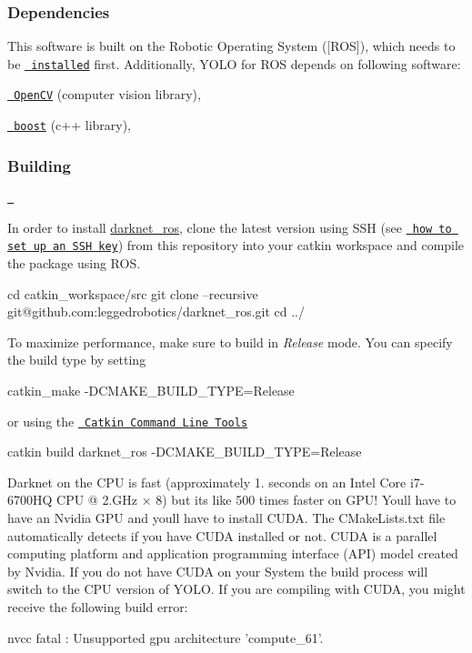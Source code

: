 \subsubsection*{Dependencies}

This software is built on the Robotic Operating System (\mbox{[}R\+OS\mbox{]}), which needs to be \href{http://wiki.ros.org}{\texttt{ installed}} first. Additionally, Y\+O\+LO for R\+OS depends on following software\+:


\begin{DoxyItemize}
\item \href{http://opencv.org/}{\texttt{ Open\+CV}} (computer vision library),
\item \href{http://www.boost.org/}{\texttt{ boost}} (c++ library),
\end{DoxyItemize}

\subsubsection*{Building}

\href{https://ci.leggedrobotics.com/job/github_leggedrobotics/job/darknet_ros/job/master/}{\texttt{ }}

In order to install \mbox{\hyperlink{namespacedarknet__ros}{darknet\+\_\+ros}}, clone the latest version using S\+SH (see \href{https://confluence.atlassian.com/bitbucket/set-up-an-ssh-key-728138079.html}{\texttt{ how to set up an S\+SH key}}) from this repository into your catkin workspace and compile the package using R\+OS. \begin{DoxyVerb}cd catkin_workspace/src
git clone --recursive git@github.com:leggedrobotics/darknet_ros.git
cd ../
\end{DoxyVerb}


To maximize performance, make sure to build in {\itshape Release} mode. You can specify the build type by setting \begin{DoxyVerb}catkin_make -DCMAKE_BUILD_TYPE=Release
\end{DoxyVerb}


or using the \href{http://catkin-tools.readthedocs.io/en/latest/index.html\#}{\texttt{ Catkin Command Line Tools}} \begin{DoxyVerb}catkin build darknet_ros -DCMAKE_BUILD_TYPE=Release
\end{DoxyVerb}


Darknet on the C\+PU is fast (approximately 1. seconds on an Intel Core i7-\/6700\+HQ C\+PU @ 2.\+G\+Hz × 8) but it\textquotesingle{}s like 500 times faster on G\+P\+U! You\textquotesingle{}ll have to have an Nvidia G\+PU and you\textquotesingle{}ll have to install C\+U\+DA. The C\+Make\+Lists.\+txt file automatically detects if you have C\+U\+DA installed or not. C\+U\+DA is a parallel computing platform and application programming interface (A\+PI) model created by Nvidia. If you do not have C\+U\+DA on your System the build process will switch to the C\+PU version of Y\+O\+LO. If you are compiling with C\+U\+DA, you might receive the following build error\+: \begin{DoxyVerb}nvcc fatal : Unsupported gpu architecture 'compute_61'.
\end{DoxyVerb}


